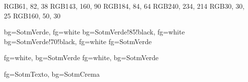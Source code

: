 %
%


\usepackage{xcolor}

\definecolor{SotmVerde}     {RGB}{61,  82,  38}   %
\definecolor{SotmOlivo}     {RGB}{143, 160, 90}   %
\definecolor{SotmTerracota} {RGB}{184, 84,  64}   %
\definecolor{SotmCrema}     {RGB}{240, 234, 214}  %
\definecolor{SotmTexto}     {RGB}{30,  30,  25}   %
\definecolor{SotmAlerta}    {RGB}{160, 50,  30}   %


\usepackage[utf8]{inputenc}
\usepackage[T1]{fontenc}
\usepackage[spanish,es-tabla,es-nodecimaldot]{babel}
\usepackage{csquotes}
\usepackage{microtype}
\usepackage{lmodern}



   {bg=SotmVerde, fg=white}
 {bg=SotmVerde!85!black, fg=white}
  {bg=SotmVerde!70!black, fg=white}
         {fg=SotmVerde}

      {fg=white, bg=SotmVerde}
 {fg=white, bg=SotmVerde}

 {fg=SotmTexto, bg=SotmCrema}

